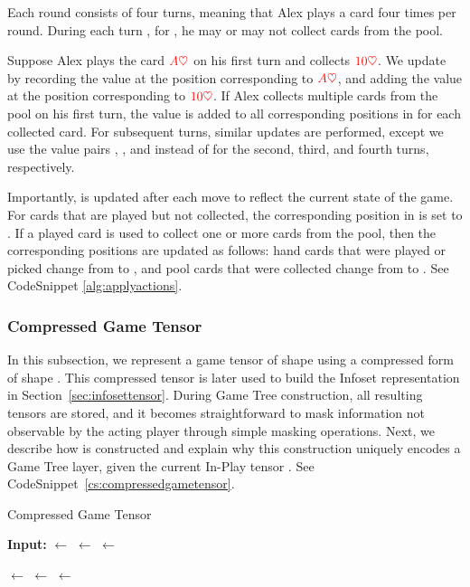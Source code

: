 Each round consists of four turns, meaning that Alex plays a card four times per round. During each turn , for , he may or may not collect cards from the pool.

Suppose Alex plays the card $\textcolor{red}{A\heartsuit}$ on his first turn and collects $\textcolor{red}{10\heartsuit}$. We update  by recording the value  at the position corresponding to $\textcolor{red}{A\heartsuit}$, and adding the value  at the position corresponding to $\textcolor{red}{10\heartsuit}$. If Alex collects multiple cards from the pool on his first turn, the value  is added to all corresponding positions in  for each collected card. For subsequent turns, similar updates are performed, except we use the value pairs , , and  instead of  for the second, third, and fourth turns, respectively.

Importantly,  is updated after each move to reflect the current state of the game. For cards that are played but not collected, the corresponding position in  is set to . If a played card is used to collect one or more cards from the pool, then the corresponding positions are updated as follows: hand cards that were played or picked change from  to , and pool cards that were collected change from  to . See CodeSnippet \ref{alg:applyactions}.

\subsubsection{Compressed Game Tensor}
In this subsection, we represent a game tensor  of shape \py{[M, 3, N]} using a compressed form  of shape \py{[M, N]}. This compressed tensor is later used to build the Infoset representation in Section~\ref{sec:infosettensor}. During Game Tree construction, all resulting  tensors are stored, and it becomes straightforward to mask information not observable by the acting player through simple masking operations. Next, we describe how  is constructed and explain why this construction uniquely encodes a Game Tree layer, given the current In-Play tensor . See CodeSnippet~\ref{cs:compressedgametensor}.

\begin{algorithm}
\caption{Compressed Game Tensor}
\label{cs:compressedgametensor}
\begin{algorithmic}[1]
\State \textbf{Input:} 
\State {} $\gets$ 
\State {} $\gets$ 
\State {} $\gets$ 

\vspace{1mm}

\State {} $\gets$ 
\State {} $\gets$ 
\State {} $\gets$ 
\end{algorithmic}
\end{algorithm}

